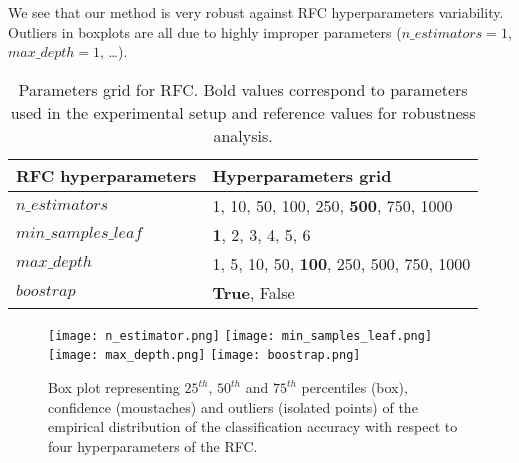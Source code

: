 \documentclass{article}
\begin{document}
We see that our method is very robust against RFC hyperparameters variability. Outliers in boxplots are all due to highly improper parameters ($n\_estimators=1$, $max\_depth=1$, \dots).


\begin{table}
    \centering
    \renewcommand{\arraystretch}{1.2}
    \begin{tabular}[t]{l|l}
    
        RFC hyperparameters     & Hyperparameters grid \\
        \hline
        $n\_estimators$         &1, 10, 50, 100, 250, \textbf{500}, 750, 1000      \\
        $min\_samples\_leaf$    & \textbf{1}, 2, 3, 4, 5, 6 \\
        $max\_depth$            & 1, 5, 10, 50, \textbf{100}, 250, 500, 750, 1000 \\
        $boostrap$              & \textbf{True}, False \\

    \end{tabular}
    
    \caption{Parameters grid for RFC. Bold values correspond to parameters used in the experimental setup and reference values for robustness analysis.}
    \label{tab:grid_para}
\end{table}


\begin{figure}
    \begin{center}
        \texttt{[image: n\_estimator.png]}
        \texttt{[image: min\_samples\_leaf.png]} \\
        \texttt{[image: max\_depth.png]}
        \texttt{[image: boostrap.png]} \\
    \end{center}

    \caption{Box plot representing $25^{th}$, $50^{th}$ and $75^{th}$ percentiles (box), confidence (moustaches) and outliers (isolated points) of the empirical distribution of the classification accuracy with respect to four hyperparameters of the RFC.}
    \label{fig:hp_sensitivity}
\end{figure}
\end{document}
